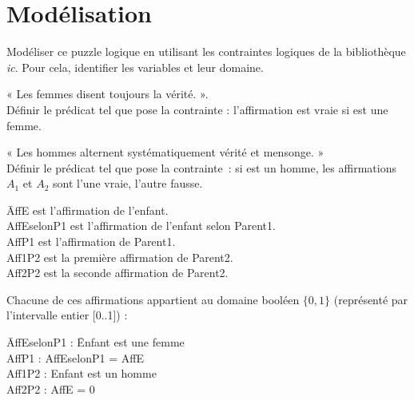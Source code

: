 \section{Modélisation}

Modéliser ce puzzle logique en utilisant les contraintes logiques de la
bibliothèque \emph{ic}. Pour cela, identifier les variables et leur domaine.

\begin{question}
« Les femmes disent toujours la vérité. ». \\
Définir le prédicat  tel que  pose
la contrainte : l'affirmation  est vraie si  est une
femme.
\end{question}

\begin{question}
« Les hommes alternent systématiquement vérité et mensonge. » \\
Définir le prédicat  tel que 
pose la contrainte~: si  est un homme, les affirmations $A_1$
et $A_2$ sont l'une vraie, l'autre fausse.
\end{question}
\begin{tabbing}
  \hspace{2.5em}\= AffE  est l'affirmation de l'enfant.\\
                \> AffEselonP1 est l'affirmation de l'enfant selon Parent1.\\
                \> AffP1 est l'affirmation de Parent1.\\
                \> Aff1P2 est la première affirmation de Parent2.\\ 
                \> Aff2P2 est la seconde affirmation de Parent2.
\end{tabbing}

Chacune de ces affirmations appartient au domaine booléen $\{0,1\}$ (représenté par l'intervalle entier [0..1]) :
\begin{tabbing}
  \hspace{2.5em}\= AffEselonP1 : \hspace{1em}\= Enfant est une femme\\
                \> AffP1       :             \> AffEselonP1 = AffE\\
                \> Aff1P2      :             \> Enfant est un homme\\
                \> Aff2P2      :             \> AffE = 0
\end{tabbing}

